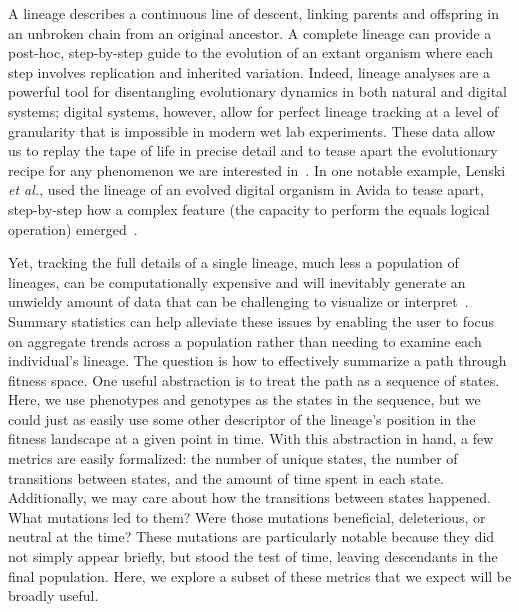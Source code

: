 \documentclass[letterpaper]{article}
\begin{document}
A lineage describes a continuous line of descent, linking parents and offspring in an unbroken chain from an original ancestor.
A complete lineage can provide a post-hoc, step-by-step guide to the evolution of an extant organism where each step involves replication and inherited variation. Indeed, lineage analyses are a powerful tool for disentangling evolutionary dynamics in both natural and digital systems; digital systems, however, allow for perfect lineage tracking at a level of granularity that is impossible in modern wet lab experiments.  These data allow us to replay the tape of life in precise detail and to tease apart the evolutionary recipe for any phenomenon we are interested in~\citep{mcphee_using_2016}. 
In one notable example, Lenski \textit{et al.}, used the lineage of an evolved digital organism in Avida to tease apart, step-by-step how a complex feature (the capacity to perform the equals logical operation) emerged~\citep{lenski_evolutionary_2003}. 

Yet, tracking the full details of a single lineage, much less a population of lineages, can be computationally expensive and will inevitably generate an unwieldy amount of data that can be challenging to visualize or interpret~\citep{mcphee_visualizing_2016}.
Summary statistics can help alleviate these issues by enabling the user to focus on aggregate trends across a population rather than needing to examine each individual's lineage. The question is how to effectively summarize a path through fitness space. One useful abstraction is to treat the path as a sequence of states. Here, we use phenotypes and genotypes as the states in the sequence, but we could just as easily use some other descriptor of the lineage's position in the fitness landscape at a given point in time.
With this abstraction in hand, a few metrics are easily formalized: the number of unique states, the number of transitions between states, and the amount of time spent in each state.
Additionally, we may care about how the transitions between states happened. What mutations led to them? Were those mutations beneficial, deleterious, or neutral at the time? These mutations are particularly notable because they did not simply appear briefly, but stood the test of time, leaving descendants in the final population.
Here, we explore a subset of these metrics that we expect will be broadly useful.
\end{document}
